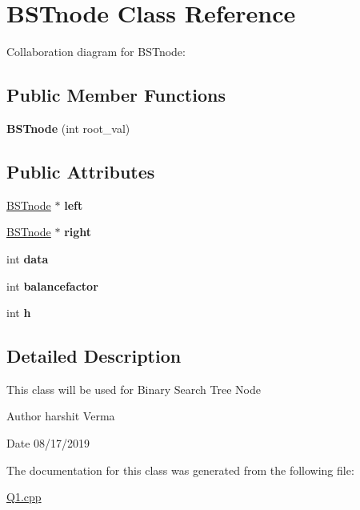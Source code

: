 \hypertarget{classBSTnode}{}\section{B\+S\+Tnode Class Reference}
\label{classBSTnode}


Collaboration diagram for B\+S\+Tnode\+:
\subsection*{Public Member Functions}
\begin{DoxyCompactItemize}
\item 
\mbox{\label{classBSTnode_a409dc25821cc67b76055375e75c810c6}} 
{\bfseries B\+S\+Tnode} (int root\+\_\+val)
\end{DoxyCompactItemize}
\subsection*{Public Attributes}
\begin{DoxyCompactItemize}
\item 
\mbox{\label{classBSTnode_a614440c999cb3bef1c99b3283978e654}} 
\hyperlink{classBSTnode}{B\+S\+Tnode} $\ast$ {\bfseries left}
\item 
\mbox{\label{classBSTnode_a6556c9a5b30b4b06aa7b5ea9f77d4300}} 
\hyperlink{classBSTnode}{B\+S\+Tnode} $\ast$ {\bfseries right}
\item 
\mbox{\label{classBSTnode_a7bd5564398058467908de78c7cf098c9}} 
int {\bfseries data}
\item 
\mbox{\label{classBSTnode_a221ed2c859b0cd1fd2e02fa1547973a7}} 
int {\bfseries balancefactor}
\item 
\mbox{\label{classBSTnode_a62d1e3dfbd544fc461f2836ef81f883b}} 
int {\bfseries h}
\end{DoxyCompactItemize}


\subsection{Detailed Description}
This class will be used for Binary Search Tree Node \begin{DoxyAuthor}{Author}
harshit Verma 
\end{DoxyAuthor}
\begin{DoxyDate}{Date}
08/17/2019 
\end{DoxyDate}


The documentation for this class was generated from the following file\+:\begin{DoxyCompactItemize}
\item 
\hyperlink{Q1_8cpp}{Q1.\+cpp}\end{DoxyCompactItemize}
